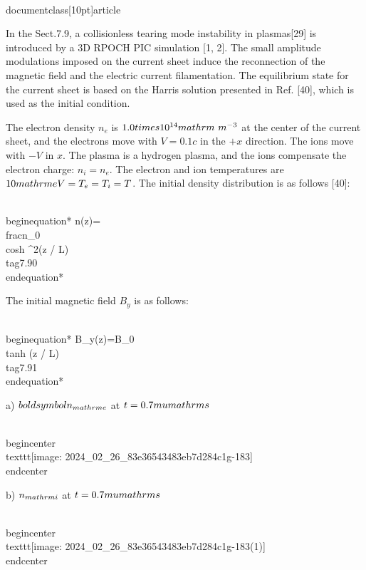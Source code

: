 \\documentclass[10pt]{article}
\begin{document}
{{{{In the Sect.7.9, a collisionless tearing mode instability in plasmas[29] is introduced by a 3D RPOCH PIC simulation [1, 2]. The small amplitude modulations imposed on the current sheet induce the reconnection of the magnetic field and the electric current filamentation. The equilibrium state for the current sheet is based on the Harris solution presented in Ref. [40], which is used as the initial condition.

The electron density $n_{e}$ is $1.0 \\times 10^{14} \\mathrm{~m}^{-3}$ at the center of the current sheet, and the electrons move with $V=0.1 c$ in the $+x$ direction. The ions move with $-V$ in $x$. The plasma is a hydrogen plasma, and the ions compensate the electron charge: $n_{i}=n_{e}$. The electron and ion temperatures are $10 \\mathrm{eV}=T_{e}=T_{i}=T$. The initial density distribution is as follows [40]:


\\begin{equation*}
n(z)=\\frac{n_{0}}{\\cosh ^{2}(z / L)} \\tag{7.90}
\\end{equation*}


The initial magnetic field $B_{y}$ is as follows:


\\begin{equation*}
B_{y}(z)=B_{0} \\tanh (z / L) \\tag{7.91}
\\end{equation*}


a) $\\boldsymbol{n}_{\\mathrm{e}}$ at $t=0.7 \\mu \\mathrm{s}$

\\begin{center}
\\texttt{[image: 2024\_02\_26\_83e36543483eb7d284c1g-183]}
\\end{center}

b) $n_{\\mathrm{i}}$ at $t=0.7 \\mu \\mathrm{s}$

\\begin{center}
\\texttt{[image: 2024\_02\_26\_83e36543483eb7d284c1g-183(1)]}
\\end{center}

}}}}
\end{document}
